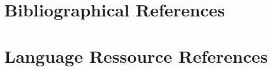 \documentclass[10pt, a4paper]{article}
\begin{document}








\section{Bibliographical References}




\section{Language Ressource References}




\end{document}
